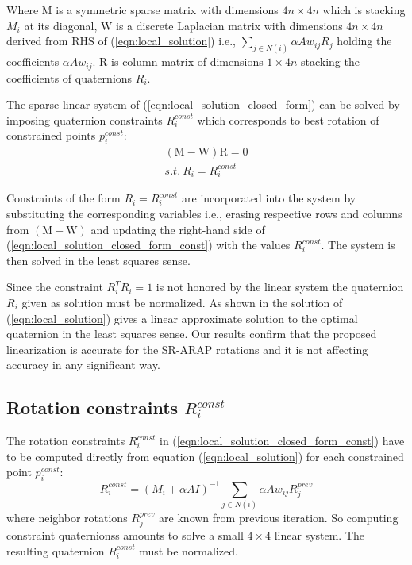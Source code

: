 \documentclass{birkjour}
\numberwithin{equation}{section}
\begin{document}
Where $\mathrm M$ is a symmetric sparse  matrix  with dimensions $4n\times 4n$ which is stacking $M_i$ at its diagonal, $\mathrm W$ is a discrete Laplacian matrix with dimensions $4n\times 4n$ derived from RHS of (\ref{eqn:local_solution}) i.e., $\sum_{j \in N(i)} {\alpha A w_{ij} R_j }$ holding the coefficients $\alpha A w_{ij}$. $\mathrm R$ is column matrix of dimensions $1\times 4n$ stacking the coefficients of quaternions $R_i$.

The sparse linear system of (\ref{eqn:local_solution_closed_form}) can be solved by imposing quaternion constraints $R^{const}_i$ which corresponds to best rotation of constrained points $p^{const}_i$:
\begin{eqnarray}
	\label{eqn:local_solution_closed_form_const}
	(\mathrm M - \mathrm W) \mathrm R = \mathrm 0\\
	s.t. \ R_i = R^{const}_i \nonumber
\end{eqnarray}

Constraints of the form $R_i = R^{const}_i$ are incorporated into the system by substituting the corresponding variables i.e., erasing respective rows and columns from $(\mathrm M - \mathrm W)$ and updating the right-hand side of (\ref{eqn:local_solution_closed_form_const}) with the values $R^{const}_i$. The system is then solved in the least squares sense.

Since the constraint $R_i^T R_i = 1$ is not honored by the linear system the quaternion $R_i$ given as solution must be normalized. As shown in \cite{Ligare2020} the solution of (\ref{eqn:local_solution}) gives a linear approximate solution to the optimal quaternion in the least squares sense. Our results confirm that the proposed linearization is accurate for the SR-ARAP rotations and it is not affecting accuracy in any significant way.

\subsection{Rotation constraints $R^{const}_i$}

The rotation constraints $R^{const}_i$ in (\ref{eqn:local_solution_closed_form_const}) have to be computed directly from equation (\ref{eqn:local_solution}) for each constrained point $p^{const}_i$:
\begin{equation}
	R^{const}_i  = (M_i + \alpha A I)^{-1}  \sum_{j \in N(i)} {\alpha A w_{ij} R^{prev}_j } \nonumber
\end{equation}
where neighbor rotations $R^{prev}_j$ are known from previous iteration. So computing constraint quaternionss amounts to solve a small $4\times4$ linear system. The resulting quaternion $R^{const}_i$ must be normalized.
\end{document}

